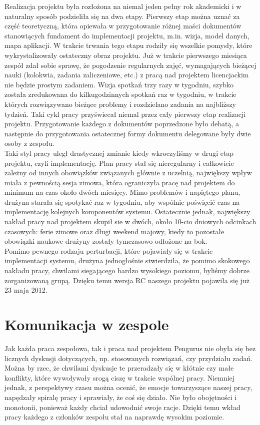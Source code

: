 \documentclass[licencjacka]{pracamgr}
\begin{document}
Realizacja projektu była rozłożona na niemal jeden pełny rok akademicki i w naturalny sposób podzieliła się na dwa etapy. 
Pierwszy etap można uznać za część teoretyczną, która opiewała w przygotowanie różnej maści dokumentów stanowiących fundament do implementacji projektu, 
m.in. wizja, model danych, mapa aplikacji.
W trakcie trwania tego etapu rodziły się wszelkie pomysły, które wykrystalizowały ostateczny obraz projektu. 
Już w trakcie pierwszego miesiąca zespół zdał sobie sprawę, że pogodzenie regularnych zajęć, wymagających bieżącej nauki
(kolokwia, zadania zaliczeniowe, etc.) z pracą nad projektem licencjackim nie będzie prostym zadaniem. 
Wizja spotkań trzy razy w tygodniu, szybko została zredukowana do kilkugodzinnych spotkań raz w tygodniu, 
w trakcie których rozwiązywano bieżące problemy i rozdzielano zadania na najbliższy tydzień. 
Taki cykl pracy przyświecał niemal przez cały pierwszy etap realizacji projektu.
Przygotowanie każdego z dokumentów poprzedzone było debatą, 
a następnie do przygotowania ostatecznej formy dokumentu delegowane były dwie osoby z zespołu.\\

Taki styl pracy uległ drastycznej zmianie kiedy wkroczyliśmy w drugi etap projektu, czyli implementację.
Plan pracy stał się nieregularny i całkowicie zależny od innych obowiązków związanych głównie z uczelnią, 
największy wpływ miała z pewnością sesja zimowa, która ograniczyła pracę nad projektem do minimum na czas około dwóch miesięcy.
Mimo problemów i napiętego planu, drużyna starała się spotykać raz w tygodniu, aby wspólnie poświęcić czas na implementację 
kolejnych komponentów systemu. Ostatecznie jednak, największy nakład pracy nad projektem skupił sie w dwóch, około 10-cio dniowych odcinkach czasowych:
ferie zimowe oraz długi weekend majowy, kiedy to pozostałe obowiązki naukowe drużyny zostały tymczasowo odłożone na bok.\\

Pomimo pewnego rodzaju perturbacji, które pojawiały się w trakcie implementacji systemu, drużyna jednogłośnie stwierdziła,
że pomimo skokowego nakładu pracy, chwilami siegającego bardzo wysokiego poziomu, byliśmy dobrze zorganizowaną grupą.
Dzięku temu wersja RC naszego projektu pojawiła się już 23 maja 2012. 

\section{Komunikacja w zespole}
Jak każda praca zespołowa, tak i praca nad projektem Pengurus nie obyła się bez licznych dyskusji dotyczących, np. stosowanych rozwiązań, czy przydziału zadań.
Można by rzec, że chwilami dyskusje te przeradzały się w kłótnie czy małe konflikty, które wywoływały srogą ciszę w trakcie wspólnej pracy. 
Niemniej jednak, z perspektywy czasu można ocenić, że
emocje towarzyszące naszej pracy, napędzały spiralę pracy i sprawiały, że coś się działo. Nie było obojętności i monotonii, ponieważ każdy chciał udowodnić 
swoje racje. Dzięki temu wkład pracy każdego z członków zespołu stał na naprawdę wysokim poziomie.\\
\end{document}

